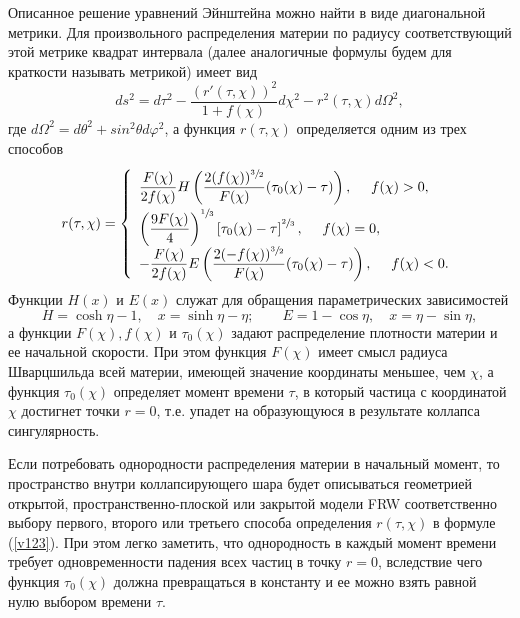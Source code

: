 \documentclass[12pt]{article}
\newcommand{\bq}{\begin{equation}}
\newcommand{\eq}{\end{equation}}
\renewcommand{\sh}{\sinh}
\renewcommand{\ch}{\cosh}
\begin{document}
Описанное решение уравнений Эйнштейна можно найти в виде диагональной метрики. Для произвольного распределения материи по радиусу
соответствующий этой метрике квадрат интервала (далее аналогичные формулы будем для краткости называть метрикой) имеет вид \cite{landavshic2}
\bq
\label{metric}
	d s^2 = d \tau^2 - \frac{(r'(\tau, \chi))^2}{1+f(\chi)} d\chi^2 - r^2(\tau, \chi) d \Omega^2,
\eq
где $d\Omega^2=d\theta^2+sin^2\theta d\varphi^2$, а
функция $r(\tau, \chi)$ определяется одним из трех способов
\bq
\label{v123}
	r(\tau, \chi) = \left\{
	\begin{array}{l}
	\vphantom{\Biggr(}
    \dfrac{F(\chi)}{2 f(\chi)} H \left( \dfrac{2(f(\chi))^{\sfrac{3}{2}} }{F(\chi)}(\tau_0(\chi)-\tau)  \right) , \ \ \ \ f(\chi) > 0,\\
	\left( \dfrac{9F(\chi)}{4} \right)^{\sfrac{1}{3}} \left[ \tau_0(\chi)- \tau \right]^{\sfrac{2}{3}}, \ \ \ \ f(\chi) = 0, \\
	- \dfrac{F(\chi)}{2 f(\chi)} E \left( \dfrac{2(-f(\chi))^{\sfrac{3}{2}} }{F(\chi)}(\tau_0(\chi)-\tau) \right), \ \ \ \ f(\chi) < 0.
	\end{array} \right.
\eq
Функции $H(x)$ и $E(x)$ служат для обращения параметрических зависимостей
\bq\label{sp4}
H = \ch{\eta}-1,\quad x = \sh{\eta} - \eta;\qquad
E = 1 - \cos{\eta},\quad x = \eta - \sin{\eta},
\eq
а функции $F(\chi), f(\chi)$ и $\tau_0(\chi)$ задают распределение плотности материи и ее начальной скорости.
При этом функция $F(\chi)$ имеет смысл радиуса Шварцшильда всей материи, имеющей значение координаты меньшее, чем $\chi$,
а функция $\tau_0(\chi)$ определяет момент времени $\tau$, в который частица с координатой $\chi$
достигнет точки $r=0$, т.е. упадет на образующуюся в результате коллапса сингулярность.

Если потребовать однородности распределения материи в начальный момент, то пространство внутри коллапсирующего шара будет описываться геометрией открытой, пространственно-плоской или закрытой модели FRW соответственно выбору первого, второго или третьего способа определения $r(\tau, \chi)$ в формуле (\ref{v123}).
При этом легко заметить, что однородность в каждый момент времени требует одновременности падения всех частиц
в точку $r=0$, вследствие чего функция $\tau_0(\chi)$ должна превращаться в константу и ее можно взять равной нулю выбором времени $\tau$.
\end{document}
